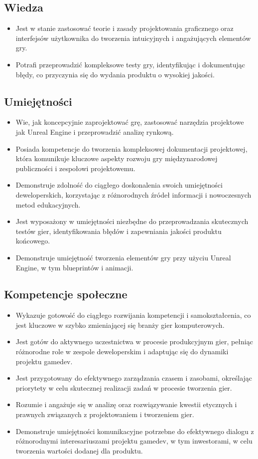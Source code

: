 \documentclass[12pt, a4paper]{article}
\begin{document}
\subsection*{Wiedza}
\begin{itemize}
  \item Jest w stanie zastosować teorie i zasady projektowania graficznego oraz interfejsów użytkownika do tworzenia intuicyjnych i angażujących elementów gry.
  \item Potrafi przeprowadzić kompleksowe testy gry, identyfikując i dokumentując błędy, co przyczynia się do wydania produktu o wysokiej jakości.
\end{itemize}

\subsection*{Umiejętności}
\begin{itemize}
  \item Wie, jak koncepcyjnie zaprojektować grę, zastosować narzędzia projektowe jak Unreal Engine i przeprowadzić analizę rynkową.
  \item Posiada kompetencje do tworzenia kompleksowej dokumentacji projektowej, która komunikuje kluczowe aspekty rozwoju gry międzynarodowej publiczności i zespołowi projektowemu.
  \item Demonstruje zdolność do ciągłego doskonalenia swoich umiejętności deweloperskich, korzystając z różnorodnych źródeł informacji i nowoczesnych metod edukacyjnych.
  \item Jest wyposażony w umiejętności niezbędne do przeprowadzania skutecznych testów gier, identyfikowania błędów i zapewniania jakości produktu końcowego.
  \item Demonstruje umiejętność tworzenia elementów gry przy użyciu Unreal Engine, w tym blueprintów i animacji.
\end{itemize}

\subsection*{Kompetencje społeczne}
\begin{itemize}
  \item Wykazuje gotowość do ciągłego rozwijania kompetencji i samokształcenia, co jest kluczowe w szybko zmieniającej się branży gier komputerowych.
  \item Jest gotów do aktywnego uczestnictwa w procesie produkcyjnym gier, pełniąc różnorodne role w zespole deweloperskim i adaptując się do dynamiki projektu gamedev.
  \item Jest przygotowany do efektywnego zarządzania czasem i zasobami, określając priorytety w celu skutecznej realizacji zadań w procesie tworzenia gier.
  \item Rozumie i angażuje się w analizę oraz rozwiązywanie kwestii etycznych i prawnych związanych z projektowaniem i tworzeniem gier.
  \item Demonstruje umiejętności komunikacyjne potrzebne do efektywnego dialogu z różnorodnymi interesariuszami projektu gamedev, w tym inwestorami, w celu tworzenia wartości dodanej dla produktu.
\end{itemize}
\end{document}
